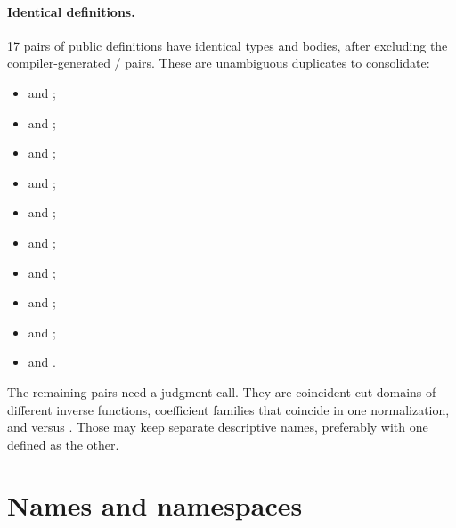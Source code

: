 \documentclass[11pt,a4paper]{article}
\begin{document}
\paragraph{Identical definitions.}
17 pairs of public definitions have identical types and bodies, after excluding the
compiler-generated / pairs. These are unambiguous duplicates to
consolidate:
\begin{itemize}
  \item {} and ;
  \item {} and ;
  \item {} and ;
  \item {} and ;
  \item {} and ;
  \item {} and ;
  \item {} and ;
  \item {} and ;
  \item {} and ;
  \item {} and .
\end{itemize}
The remaining pairs need a judgment call. They are coincident cut domains of different
inverse functions, coefficient families that coincide in one normalization, and
 versus . Those may keep separate descriptive
names, preferably with one defined as the other.

\section{Names and namespaces}
\end{document}
